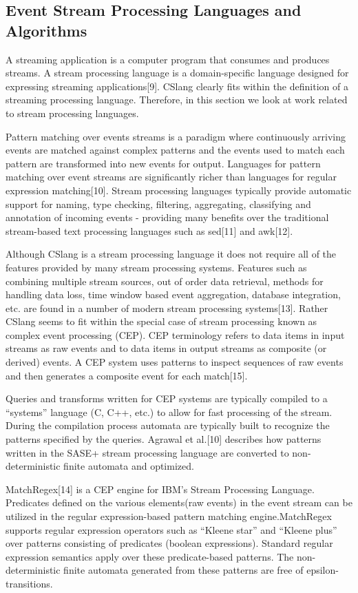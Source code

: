 \subsection{Event Stream Processing Languages and Algorithms}

A streaming application is a computer program that consumes and
produces streams. A stream processing language is a domain-specific language
designed for expressing streaming applications[9]. CSlang clearly
fits within the definition of a streaming processing language. Therefore, in this
section we look at work related to stream processing languages.

Pattern matching
over events streams is a paradigm where continuously arriving events are matched
against complex patterns and the events used to match each pattern are
transformed into new events for output. Languages for pattern matching over event
streams are significantly richer than languages for regular expression
matching[10]. Stream processing languages typically provide automatic
support for naming, type checking, filtering, aggregating, classifying and
annotation of incoming events - providing many benefits over the traditional
stream-based text processing languages such as sed[11] and
awk[12].

Although CSlang is a stream processing language it does not
require all of the features provided by many stream processing systems. Features
such as combining multiple stream sources, out of order data retrieval, methods
for handling data loss, time window based event aggregation, database
integration, etc. are found in a number of modern stream processing
systems[13].   Rather CSlang seems to fit within the special case of
stream processing known as complex event processing (CEP). CEP terminology refers
to data items in input streams as raw events and to data items in output streams
as composite (or derived) events. A CEP system uses patterns to inspect
sequences of raw events and then generates a composite event for each
match[15].

Queries and transforms written for CEP systems are
typically compiled to a “systems” language (C, C++, etc.) to allow for fast
processing of the stream. During the compilation process automata are typically
built to recognize the patterns specified by the queries. Agrawal et
al.[10] describes how patterns written in the SASE+ stream
processing language are converted to non-deterministic finite automata and
optimized.

MatchRegex[14] is a CEP engine for IBM’s Stream Processing
Language. Predicates defined on the various elements(raw events) in the event
stream can be utilized in the regular expression-based pattern matching
engine.MatchRegex supports regular expression operators such as “Kleene star”
and “Kleene plus” over patterns consisting of predicates (boolean expressions).
Standard regular expression semantics apply over these predicate-based patterns.
The non-deterministic finite automata generated from these patterns are free of
epsilon-transitions.
